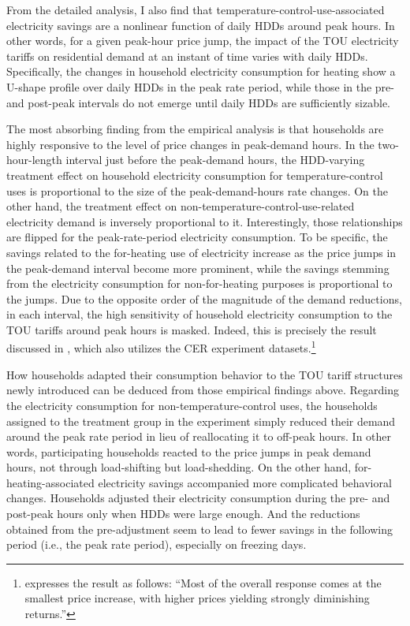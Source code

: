 From the detailed analysis, I also find that temperature-control-use-associated electricity savings are a nonlinear function of daily HDDs around peak hours. In other words, for a given peak-hour price jump, the impact of the TOU electricity tariffs on residential demand at an instant of time varies with daily HDDs. Specifically, the changes in household electricity consumption for heating show a U-shape profile over daily HDDs in the peak rate period, while those in the pre- and post-peak intervals do not emerge until daily HDDs are sufficiently sizable. 

The most absorbing finding from the empirical analysis is that households are highly responsive to the level of price changes in peak-demand hours. In the two-hour-length interval just before the peak-demand hours, the HDD-varying treatment effect on household electricity consumption for temperature-control uses is proportional to the size of the peak-demand-hours rate changes. On the other hand, the treatment effect on non-temperature-control-use-related electricity demand is inversely proportional to it. Interestingly, those relationships are flipped for the peak-rate-period electricity consumption. To be specific, the savings related to the for-heating use of electricity increase as the price jumps in the peak-demand interval become more prominent, while the savings stemming from the electricity consumption for non-for-heating purposes is proportional to the jumps. Due to the opposite order of the magnitude of the demand reductions, in each interval, the high sensitivity of household electricity consumption to the TOU tariffs around peak hours is masked. Indeed, this is precisely the result discussed in \cite{Peaking-Interest:How-Awareness-Drives-the-Effectiveness-of-Time-of-Use-Electricity-Pricing_Prest_2020}, which also utilizes the CER experiment datasets.\footnote{\cite{Peaking-Interest:How-Awareness-Drives-the-Effectiveness-of-Time-of-Use-Electricity-Pricing_Prest_2020} expresses the result as follows: ``Most of the overall response comes at the smallest price increase, with higher prices yielding strongly diminishing returns.''}

How households adapted their consumption behavior to the TOU tariff structures newly introduced can be deduced from those empirical findings above. Regarding the electricity consumption for non-temperature-control uses, the households assigned to the treatment group in the experiment simply reduced their demand around the peak rate period in lieu of reallocating it to off-peak hours. In other words, participating households reacted to the price jumps in peak demand hours, not through load-shifting but load-shedding. On the other hand, for-heating-associated electricity savings accompanied more complicated behavioral changes. Households adjusted their electricity consumption during the pre- and post-peak hours only when HDDs were large enough. And the reductions obtained from the pre-adjustment seem to lead to fewer savings in the following period (i.e., the peak rate period), especially on freezing days. 

